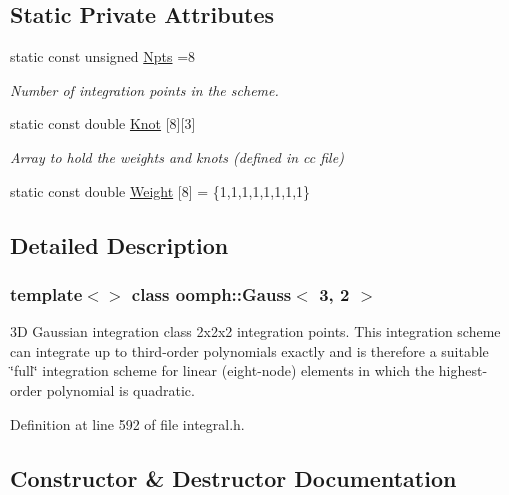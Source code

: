 \subsection*{Static Private Attributes}
\begin{DoxyCompactItemize}
\item 
static const unsigned \hyperlink{classoomph_1_1Gauss_3_013_00_012_01_4_afd00a1b937d71d1eb35a6ab66fff12eb}{Npts} =8
\begin{DoxyCompactList}\small\item\em Number of integration points in the scheme. \end{DoxyCompactList}\item 
static const double \hyperlink{classoomph_1_1Gauss_3_013_00_012_01_4_a912e196dc719493e61224026a0bd274f}{Knot} \mbox{[}8\mbox{]}\mbox{[}3\mbox{]}
\begin{DoxyCompactList}\small\item\em Array to hold the weights and knots (defined in cc file) \end{DoxyCompactList}\item 
static const double \hyperlink{classoomph_1_1Gauss_3_013_00_012_01_4_acef38067755c8a3cf352f70f4ccfe8bc}{Weight} \mbox{[}8\mbox{]} = \{1,1,1,1,1,1,1,1\}
\end{DoxyCompactItemize}


\subsection{Detailed Description}
\subsubsection*{template$<$$>$\newline
class oomph\+::\+Gauss$<$ 3, 2 $>$}

3D Gaussian integration class 2x2x2 integration points. This integration scheme can integrate up to third-\/order polynomials exactly and is therefore a suitable \char`\"{}full\char`\"{} integration scheme for linear (eight-\/node) elements in which the highest-\/order polynomial is quadratic. 

Definition at line 592 of file integral.\+h.



\subsection{Constructor \& Destructor Documentation}
\mbox{\label{classoomph_1_1Gauss_3_013_00_012_01_4_aaa67fc4f36e0fe115de0620331172e6b}} 
